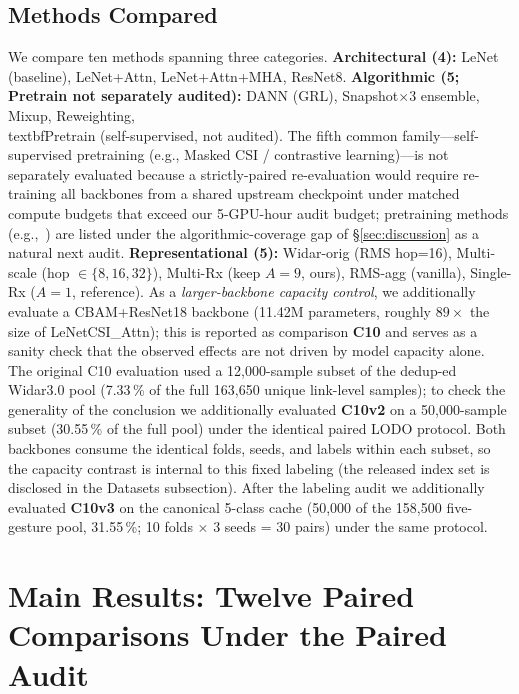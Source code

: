 \documentclass[journal,11pt]{IEEEtran}
\begin{document}
\subsection{Methods Compared}
We compare ten methods spanning three categories. \textbf{Architectural (4):} LeNet (baseline), LeNet+Attn, LeNet+Attn+MHA, ResNet8. \textbf{Algorithmic (5; Pretrain not separately audited):} DANN (GRL), Snapshot$\times$3 ensemble, Mixup, Reweighting, \\textbf{Pretrain (self-supervised, not audited)}. The fifth common family---self-supervised pretraining (e.g., Masked CSI / contrastive learning)---is not separately evaluated because a strictly-paired re-evaluation would require re-training all backbones from a shared upstream checkpoint under matched compute budgets that exceed our 5-GPU-hour audit budget; pretraining methods (e.g.,~\cite{ma2022}) are listed under the algorithmic-coverage gap of \S\ref{sec:discussion} as a natural next audit. \textbf{Representational (5):} Widar-orig (RMS hop=16), Multi-scale (hop $\in \{8, 16, 32\}$), Multi-Rx (keep $A=9$, ours), RMS-agg (vanilla), Single-Rx ($A=1$, reference). As a \emph{larger-backbone capacity control}, we additionally evaluate a CBAM+ResNet18 backbone (11.42M parameters, roughly $89\times$ the size of LeNetCSI\_Attn); this is reported as comparison \textbf{C10} and serves as a sanity check that the observed effects are not driven by model capacity alone. The original C10 evaluation used a 12{,}000-sample subset of the dedup-ed Widar3.0 pool (7.33\,\% of the full 163{,}650 unique link-level samples); to check the generality of the conclusion we additionally evaluated \textbf{C10v2} on a 50{,}000-sample subset (30.55\,\% of the full pool) under the identical paired LODO protocol. Both backbones consume the identical folds, seeds, and labels within each subset, so the capacity contrast is internal to this fixed labeling (the released index set is disclosed in the Datasets subsection). After the labeling audit we additionally evaluated \textbf{C10v3} on the canonical 5-class cache (50{,}000 of the 158{,}500 five-gesture pool, 31.55\,\%; 10 folds $\times$ 3 seeds = 30 pairs) under the same protocol.

\section{Main Results: Twelve Paired Comparisons Under the Paired \mbox{Audit}}
\label{sec:results}
\end{document}
